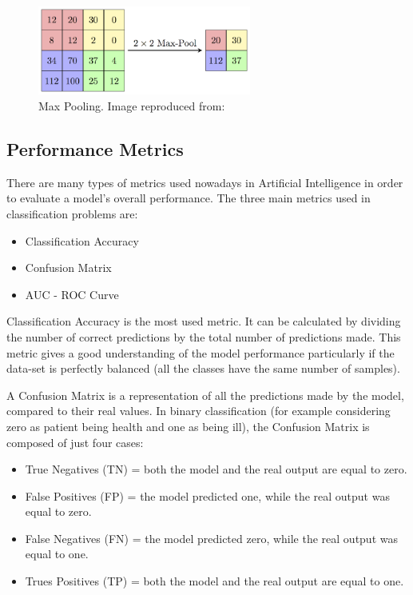 \begin{figure}[ht!]%
    \centering
    \includegraphics[width=7cm]{images/maxpoll.png}%
    \caption{Max Pooling. Image reproduced from: \cite{cnn2}}%
\end{figure}

\subsection{Performance Metrics} 

There are many types of metrics used nowadays in Artificial Intelligence in order to evaluate a model's overall performance. The three main metrics used in classification problems are:

\begin{itemize}
\itemsep0em
\item Classification Accuracy
\item Confusion Matrix 
\item AUC - ROC Curve
\end{itemize}

Classification Accuracy is the most used metric. It can be calculated by dividing the number of correct predictions by the total number of predictions made. This metric gives a good understanding of the model performance particularly if the data-set is perfectly balanced (all the classes have the same number of samples). 

A Confusion Matrix is a representation of all the predictions made by the model, compared to their real values. In binary classification (for example considering zero as patient being health and one as being ill), the Confusion Matrix is composed of just four cases:
\begin{itemize}
\itemsep0em
\item True Negatives (TN) = both the model and the real output are equal to zero.
\item False Positives (FP) = the model predicted one, while the real output was equal to zero.
\item False Negatives (FN) = the model predicted zero, while the real output was equal to one.
\item Trues Positives (TP) = both the model and the real output are equal to one.
\end{itemize}

